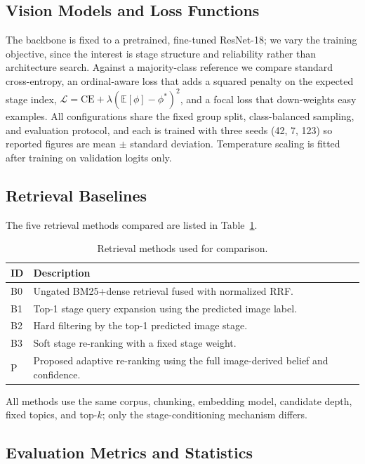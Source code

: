 \documentclass{llncs}
\begin{document}
\subsection{Vision Models and Loss Functions}

The backbone is fixed to a pretrained, fine-tuned ResNet-18; we vary the training objective, since the interest is stage structure and reliability rather than architecture search. Against a majority-class reference we compare standard cross-entropy, an ordinal-aware loss that adds a squared penalty on the expected stage index, $\mathcal{L}=\mathrm{CE}+\lambda(\mathbb{E}[\phi]-\phi^*)^2$, and a focal loss that down-weights easy examples. All configurations share the fixed group split, class-balanced sampling, and evaluation protocol, and each is trained with three seeds (42, 7, 123) so reported figures are mean $\pm$ standard deviation. Temperature scaling is fitted after training on validation logits only.

\subsection{Retrieval Baselines}

The five retrieval methods compared are listed in Table~\ref{tab:baselines}.

\begin{table}[t]
\centering
\caption{Retrieval methods used for comparison.}
\label{tab:baselines}
\small
\begin{tabular}{lp{}}
\toprule
\textbf{ID} & \textbf{Description} \\
\midrule
B0 & Ungated BM25+dense retrieval fused with normalized RRF. \\
B1 & Top-1 stage query expansion using the predicted image label. \\
B2 & Hard filtering by the top-1 predicted image stage. \\
B3 & Soft stage re-ranking with a fixed stage weight. \\
P & Proposed adaptive re-ranking using the full image-derived belief and confidence. \\
\bottomrule
\end{tabular}
\end{table}

All methods use the same corpus, chunking, embedding model, candidate depth, fixed topics, and top-$k$; only the stage-conditioning mechanism differs.

\subsection{Evaluation Metrics and Statistics}
\end{document}
